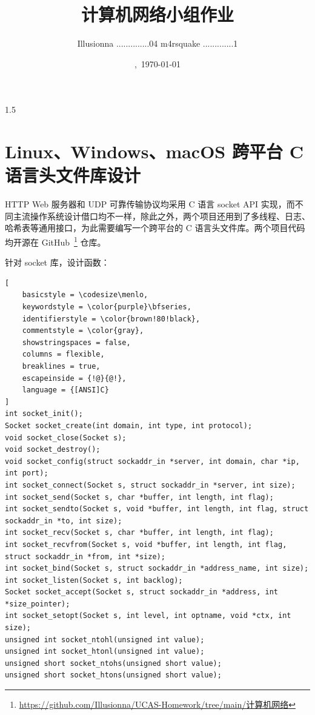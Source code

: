 \documentclass{article}
\title{计算机网络小组作业}
\author{Illusionna \quad 2025..............04 \qquad m4rsquake \quad 2025.............1}
\date{\currenttime,\ \today}
\newcommand{\codesize}{\fontsize{7pt}{9pt}\selectfont}
\begin{document}
\maketitle

\begin{spacing}{1.5}
    \tableofcontents
\end{spacing}
\thispagestyle{empty}
\hypersetup{
    colorlinks = true,
    linkcolor = red,
    urlcolor = magenta
}
\clearpage
\setcounter{page}{1}



\section{Linux、Windows、macOS 跨平台 C 语言头文件库设计}
HTTP Web 服务器和 UDP 可靠传输协议均采用 C 语言 socket API 实现，而不同主流操作系统设计借口均不一样，除此之外，两个项目还用到了多线程、日志、哈希表等通用接口，为此需要编写一个跨平台的 C 语言头文件库。两个项目代码均开源在 GitHub~\footnote[1]{\href{https://github.com/Illusionna/UCAS-Homework/tree/main/计算机网络}{https://github.com/Illusionna/UCAS-Homework/tree/main/计算机网络}} 仓库。

针对 socket 库，设计函数：

\begin{lstlisting}[
    basicstyle = \codesize\menlo,
    keywordstyle = \color{purple}\bfseries,
    identifierstyle = \color{brown!80!black},
    commentstyle = \color{gray},
    showstringspaces = false,
    columns = flexible,
    breaklines = true,
    escapeinside = {!@}{@!},
    language = {[ANSI]C}
]
int socket_init();
Socket socket_create(int domain, int type, int protocol);
void socket_close(Socket s);
void socket_destroy();
void socket_config(struct sockaddr_in *server, int domain, char *ip, int port);
int socket_connect(Socket s, struct sockaddr_in *server, int size);
int socket_send(Socket s, char *buffer, int length, int flag);
int socket_sendto(Socket s, void *buffer, int length, int flag, struct sockaddr_in *to, int size);
int socket_recv(Socket s, char *buffer, int length, int flag);
int socket_recvfrom(Socket s, void *buffer, int length, int flag, struct sockaddr_in *from, int *size);
int socket_bind(Socket s, struct sockaddr_in *address_name, int size);
int socket_listen(Socket s, int backlog);
Socket socket_accept(Socket s, struct sockaddr_in *address, int *size_pointer);
int socket_setopt(Socket s, int level, int optname, void *ctx, int size);
unsigned int socket_ntohl(unsigned int value);
unsigned int socket_htonl(unsigned int value);
unsigned short socket_ntohs(unsigned short value);
unsigned short socket_htons(unsigned short value);
\end{lstlisting}
\end{document}
